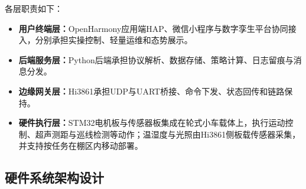 \documentclass{article}
\begin{document}
各层职责如下：
\begin{itemize}[leftmargin=2em,itemsep=0.2em,topsep=0.2em]
  \item \textbf{用户终端层：}OpenHarmony应用端HAP、微信小程序与数字孪生平台协同接入，分别承担实操控制、轻量运维和态势展示。
  \item \textbf{后端服务层：}Python后端承担协议解析、数据存储、策略计算、日志留痕与消息分发。
  \item \textbf{边缘网关层：}Hi3861承担UDP与UART桥接、命令下发、状态回传和链路保持。
  \item \textbf{硬件执行层：}STM32电机板与传感器板集成在轮式小车载体上，执行运动控制、超声测距与巡线检测等动作；温湿度与光照由Hi3861侧板载传感器采集，并支持按任务在棚区内移动部署。
\end{itemize}

\subsection{硬件系统架构设计}
\end{document}
